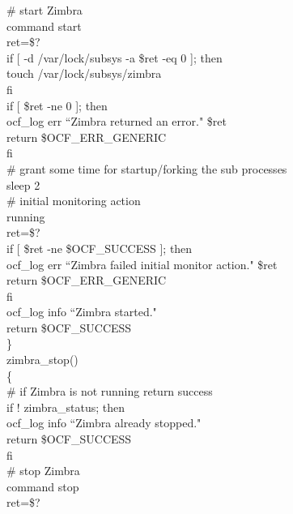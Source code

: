 \documentclass[a4paper, 12pt]{book}
\begin{document}
    \indent \# start Zimbra\\
    \indent command start\\
    \indent ret=\$?\\
    \indent if [ -d /var/lock/subsys -a \$ret -eq 0 ]; then\\
    \indent \indent touch /var/lock/subsys/zimbra\\
    \indent fi\\

    \indent if [ \$ret -ne 0 ]; then\\
        \indent \indent ocf\_log err ``Zimbra returned an error." \$ret\\
        \indent \indent return \$OCF\_ERR\_GENERIC\\
    \indent fi\\

    \indent \# grant some time for startup/forking the sub processes\\
    \indent sleep 2\\

    \indent \# initial monitoring action\\
    \indent running\\
    \indent ret=\$?\\
    \indent if [ \$ret -ne \$OCF\_SUCCESS ]; then\\
     \indent \indent ocf\_log err ``Zimbra failed initial monitor action." \$ret\\
     \indent \indent return \$OCF\_ERR\_GENERIC\\
    \indent fi\\

    \indent ocf\_log info ``Zimbra started."\\
    \indent return \$OCF\_SUCCESS\\
\}\\


\noindent zimbra\_stop()\\
\{\\
    \indent \# if Zimbra is not running return success\\
    \indent if ! zimbra\_status; then\\
        \indent \indent ocf\_log info ``Zimbra already stopped."\\
        \indent \indent return \$OCF\_SUCCESS\\
    \indent fi\\

    \indent \# stop Zimbra\\
    \indent command stop \\
    \indent ret=\$?\\
\end{document}
